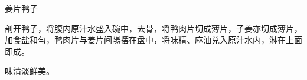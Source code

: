 \begin{recipe}{姜片鸭子}

\ingredients


\cooking

剖开鸭子，将腹内原汁水盛入碗中，去骨，将鸭肉片切成薄片，子姜亦切成薄片，加食盐和勻，鸭肉片与姜片间陽摆在盘中，将味精、麻油兑入原汁水内，淋在上面即成。

\notes

味清淡鲜美。

\end{recipe}

